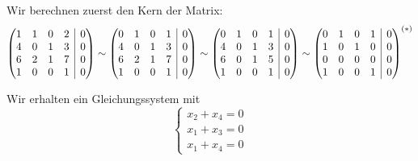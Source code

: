 \documentclass[answers]{exam}
\makeatletter
\newenvironment{sysmatrix}[1]
  {\left(\begin{array}{@{}#1@{}}}
  {\end{array}\right)}
\makeatother
\begin{document}
\begin{questions}
\begin{parts}
\begin{solution}
            Wir berechnen zuerst den Kern der Matrix:
            $$
                \begin{sysmatrix}{cccc|c}
                    1 & 1 & 0 & 2 & 0 \\
                    4 & 0 & 1 & 3 & 0 \\
                    6 & 2 & 1 & 7 & 0 \\
                    1 & 0 & 0 & 1 & 0
                \end{sysmatrix}
                \sim
                \begin{sysmatrix}{cccc|c}
                    0 & 1 & 0 & 1 & 0 \\
                    4 & 0 & 1 & 3 & 0 \\
                    6 & 2 & 1 & 7 & 0 \\
                    1 & 0 & 0 & 1 & 0
                \end{sysmatrix}
                \sim
                \begin{sysmatrix}{cccc|c}
                    0 & 1 & 0 & 1 & 0 \\
                    4 & 0 & 1 & 3 & 0 \\
                    6 & 0 & 1 & 5 & 0 \\
                    1 & 0 & 0 & 1 & 0
                \end{sysmatrix}
                \sim
                \begin{sysmatrix}{cccc|c}
                    0 & 1 & 0 & 1 & 0 \\
                    1 & 0 & 1 & 0 & 0 \\
                    0 & 0 & 0 & 0 & 0 \\
                    1 & 0 & 0 & 1 & 0
                \end{sysmatrix}^{(*)}
            $$

            Wir erhalten ein Gleichungssystem mit
            $$
                \begin{cases}
                    x_2 + x_4 = 0 \\
                    x_1 + x_3 = 0 \\
                    x_1 + x_4 = 0
                \end{cases}
            $$


\end{solution}
\end{parts}
\end{questions}
\end{document}
